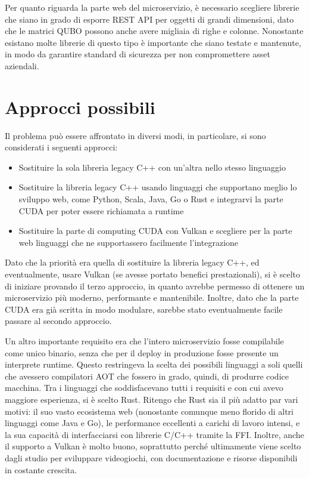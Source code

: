Per quanto riguarda la parte web del microservizio, è necessario scegliere librerie che siano in grado di esporre REST API per oggetti di grandi dimensioni, dato che le matrici QUBO possono anche avere migliaia di righe e colonne. Nonostante esistano molte librerie di questo tipo è importante che siano testate e mantenute, in modo da garantire standard di sicurezza per non compromettere asset aziendali.


\section{Approcci possibili}

Il problema può essere affrontato in diversi modi, in particolare, si sono considerati i seguenti approcci:

\begin{itemize}
    \item Sostituire la sola libreria legacy C++ con un'altra nello stesso linguaggio
    \item Sostituire la libreria legacy C++ usando linguaggi che supportano meglio lo sviluppo web, come Python, Scala, Java, Go o Rust e integrarvi la parte CUDA per poter essere richiamata a runtime
    \item Sostituire la parte di computing CUDA con Vulkan e scegliere per la parte web linguaggi che ne supportassero facilmente l'integrazione 
\end{itemize}

Dato che la priorità era quella di sostituire la libreria legacy C++, ed eventualmente, usare Vulkan (se avesse portato benefici prestazionali), si è scelto di iniziare provando il terzo approccio, in quanto avrebbe permesso di ottenere un microservizio più moderno, performante e mantenibile. Inoltre, dato che la parte CUDA era già scritta in modo modulare, sarebbe stato eventualmente facile passare al secondo approccio. 

Un altro importante requisito era che l'intero microservizio fosse compilabile come unico binario, senza che per il deploy in produzione fosse presente un interprete runtime. Questo restringeva la scelta dei possibili linguaggi a soli quelli che avessero compilatori \gls{AOT} che fossero in grado, quindi, di produrre codice macchina. Tra i linguaggi che soddisfacevano tutti i requisiti e con cui avevo maggiore esperienza, si è scelto Rust. Ritengo che Rust sia il più adatto par vari motivi: il suo vasto ecosistema web (nonostante comunque meno florido di altri linguaggi come Java e Go), le performance eccellenti a carichi di lavoro intensi, e la sua capacità di interfacciarsi con librerie C/C++ tramite la FFI. Inoltre, anche il supporto a Vulkan è molto buono, soprattutto perché ultimamente viene scelto dagli studio per sviluppare videogiochi, con documentazione e risorse disponibili in costante crescita.

